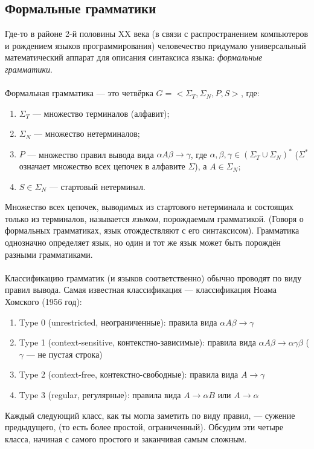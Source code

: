 \documentclass[11pt]{book}
\begin{document}
\subsection{Формальные грамматики}
Где-то в районе 2-й половины XX века
(в связи с распространением компьютеров и рождением языков программирования)
человечество придумало универсальный математический аппарат для описания синтаксиса языка: \emph{формальные грамматики}.
\\ \\
Формальная грамматика --- это четвёрка $G=<\Sigma_T,\Sigma_N,P,S>$, где:
\begin{enumerate}
\item $\Sigma_T$ --- множество терминалов (алфавит);
\item $\Sigma_N$ --- множество нетерминалов;
\item $P$ --- множество правил вывода вида $\alpha A \beta \rightarrow \gamma$,
где $\alpha, \beta, \gamma \in (\Sigma_T \cup \Sigma_N)^*$ ($\Sigma^*$ означает множество всех цепочек в алфавите $\Sigma$),
а $A \in \Sigma_N$;
\item $S \in \Sigma_N$ --- стартовый нетерминал.
\end{enumerate}
Множество всех цепочек, выводимых из стартового нетерминала и состоящих только из терминалов, называется \emph{языком},
порождаемым грамматикой.
(Говоря о формальных грамматиках, язык отождествляют с его синтаксисом).
Грамматика однозначно определяет язык, но один и тот же язык может быть порождён разными грамматиками.
\\ \\
Классификацию грамматик (и языков соответственно) обычно проводят по виду правил вывода.
Самая известная классификация --- классификация Ноама Хомского (1956 год):
\begin{enumerate}
\item Type 0 (unrestricted, неограниченные): правила вида $\alpha A \beta \rightarrow \gamma$
\item Type 1 (context-sensitive, контекстно-зависимые): правила вида $\alpha A \beta \rightarrow \alpha \gamma \beta$ ($\gamma$ --- не пустая строка)
\item Type 2 (context-free, контекстно-свободные): правила вида $A \rightarrow \gamma$
\item Type 3 (regular, регулярные): правила вида $A \rightarrow \alpha B$ или $A \rightarrow \alpha$
\end{enumerate}
Каждый следующий класс, как ты могла заметить по виду правил, --- сужение предыдущего, (то есть более простой, ограниченный).
Обсудим эти четыре класса, начиная с самого простого и заканчивая самым сложным.
\end{document}
